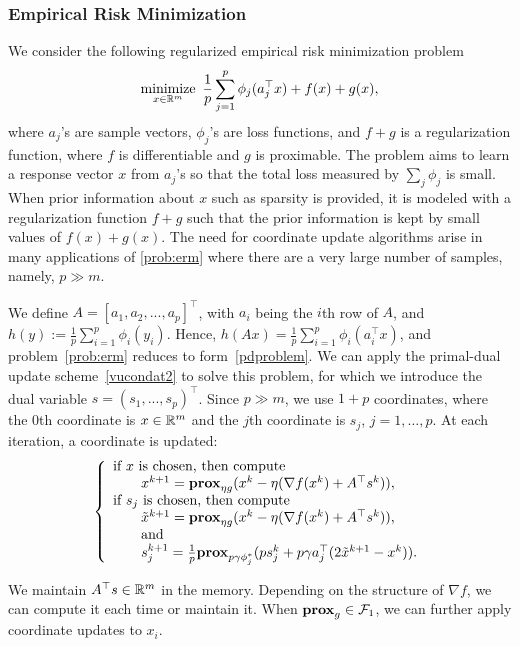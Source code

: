 \subsubsection{Empirical Risk Minimization}
We consider the following regularized empirical risk minimization problem
\begin{equation}\label{prob:erm}
\Min_{x\in\RR^m}~ \frac{1}{p}\sum_{j=1}^p\phi_j(a_j^\top x)+f(x)+g(x),
\end{equation}
where $a_j$'s are sample vectors, $\phi_j$'s are loss functions, and $f+g$ is a regularization function, where $f$ is differentiable and $g$ is proximable. The problem aims to learn a response vector $x$ from $a_j$'s so that the total loss measured by $\sum_j \phi_j$ is small. When prior information about $x$ such as sparsity is provided, it is modeled with a regularization function $f+g$ such that the prior information is kept by small values of $f(x)+g(x)$. The need for coordinate update algorithms arise in many applications of \eqref{prob:erm} where there are a very large number of samples, namely, $p\gg m$. 

We define $A=[a_1,a_2,...,a_p]^\top$, with $a_i$ being the $i$th row of $A$, and $h(y):=\frac{1}{p}\sum_{i=1}^p\phi_i(y_i)$. Hence, $h(Ax)=\frac{1}{p}\sum_{i=1}^p\phi_i(a_i^\top x)$, and problem~\eqref{prob:erm} reduces to form~\eqref{pdproblem}.
We can apply the primal-dual update scheme~\eqref{vucondat2} to solve this problem, for which we introduce the dual variable $s = (s_1, ..., s_p)^\top$. Since $p\gg m$, we use $1+p$ coordinates, where the $0$th coordinate is $x\in\mathbb{R}^m$ and the $j$th coordinate is $s_j$, $j=1,\ldots,p$.  At each iteration, a coordinate is updated:
\begin{equation}
{\left\{
\begin{array}{l}
\text{if }x\text{ is chosen, then compute}\\
\qquad {x}^{k+1}=\prox_{\eta g}(x^k-\eta(\nabla f(x^k)+A^\top s^k)),\\
\text{if }s_j\text{ is chosen, then compute}\\
\qquad\tilde{x}^{k+1}=\prox_{\eta g}(x^k-\eta(\nabla f(x^k)+A^\top s^k)),\\
\qquad\text{and}\\
\qquad{s}_j^{k+1}=\frac{1}{p}\prox_{p\gamma \phi_j^*} (ps_j^k+p\gamma a_j^\top(2\tilde{x}^{k+1}-x^k)).
\end{array}
\right.
}\end{equation}

We maintain $A^\top s\in \mathbb{R}^m$ in the memory. Depending on the structure of $\nabla f$, we can compute it each time or maintain it. When $\mathbf{prox}_g\in{\mathcal{F}}_1$, we can further apply  coordinate updates to $x_i$. 
